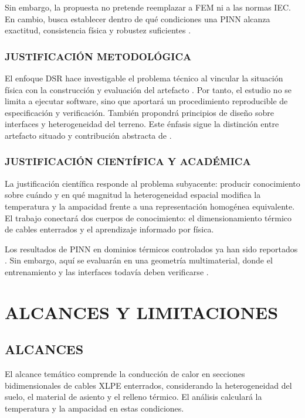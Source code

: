 \documentclass[11pt,a4paper,oneside]{report}
\begin{document}
Sin embargo, la propuesta no pretende reemplazar a FEM ni a las normas IEC. En cambio, busca establecer dentro de qué condiciones una PINN alcanza exactitud, consistencia física y robustez suficientes \parencite[93--99]{cigre2025}.

\subsubsection{JUSTIFICACIÓN METODOLÓGICA}

El enfoque DSR hace investigable el problema técnico al vincular la situación física con la construcción y evaluación del artefacto \parencite[55--56]{peffers2007}. Por tanto, el estudio no se limita a ejecutar software, sino que aportará un procedimiento reproducible de especificación y verificación. También propondrá principios de diseño sobre interfaces y heterogeneidad del terreno. Este énfasis sigue la distinción entre artefacto situado y contribución abstracta de \textcite[342--350]{gregor2013}.

\subsubsection{JUSTIFICACIÓN CIENTÍFICA Y ACADÉMICA}

La justificación científica responde al problema subyacente: producir conocimiento sobre cuándo y en qué magnitud la heterogeneidad espacial modifica la temperatura y la ampacidad frente a una representación homogénea equivalente. El trabajo conectará dos cuerpos de conocimiento: el dimensionamiento térmico de cables enterrados y el aprendizaje informado por física.

Los resultados de PINN en dominios térmicos controlados ya han sido reportados \parencites[1--3,17]{xing2023}[1,3,16]{pan2025}. Sin embargo, aquí se evaluarán en una geometría multimaterial, donde el entrenamiento y las interfaces todavía deben verificarse \parencite[2--6]{ren2025}.

\section{ALCANCES Y LIMITACIONES}

\subsection{ALCANCES}

El alcance temático comprende la conducción de calor en secciones bidimensionales de cables XLPE enterrados, considerando la heterogeneidad del suelo, el material de asiento y el relleno térmico. El análisis calculará la temperatura y la ampacidad en estas condiciones.
\end{document}
